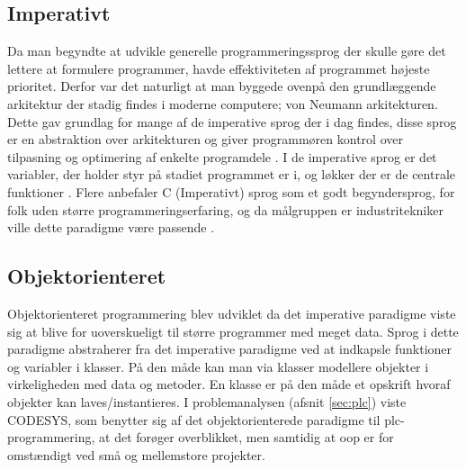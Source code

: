 \tocless \subsection{Imperativt}
\label{sec:c_is_easy2}
Da man begyndte at udvikle generelle programmeringssprog der skulle gøre det lettere at formulere programmer, havde effektiviteten af programmet højeste prioritet. Derfor var det naturligt at man byggede ovenpå den grundlæggende arkitektur der stadig findes i moderne computere; von Neumann arkitekturen. Dette gav grundlag for mange af de imperative sprog der i dag findes, disse sprog er en abstraktion over arkitekturen og giver programmøren kontrol over tilpasning og optimering af enkelte programdele \cite[38-39]{Sebesta_2013}. I de imperative sprog er det variabler, der holder styr på stadiet programmet er i, og løkker der er de centrale funktioner \cite{Sebesta_2013}. Flere anbefaler C (Imperativt) sprog som et godt begyndersprog, for folk uden større programmeringserfaring, og da målgruppen er industritekniker ville dette paradigme være passende \cite{c_is_easy}.

\tocless \subsection{Objektorienteret}
Objektorienteret programmering blev udviklet da det imperative paradigme viste sig at blive for uoverskueligt til større programmer med meget data. Sprog i dette paradigme abstraherer fra det imperative paradigme ved at indkapsle funktioner og variabler i klasser. På den måde kan man via klasser modellere objekter i virkeligheden med data og metoder. En klasse er på den måde et opskrift hvoraf objekter kan laves/instantieres. I problemanalysen (afsnit \ref{sec:plc}) viste CODESYS, som benytter sig af det objektorienterede paradigme til \gls{plc}-programmering, at det forøger overblikket, men samtidig at \gls{oop} er for omstændigt ved små og mellemstore projekter.


